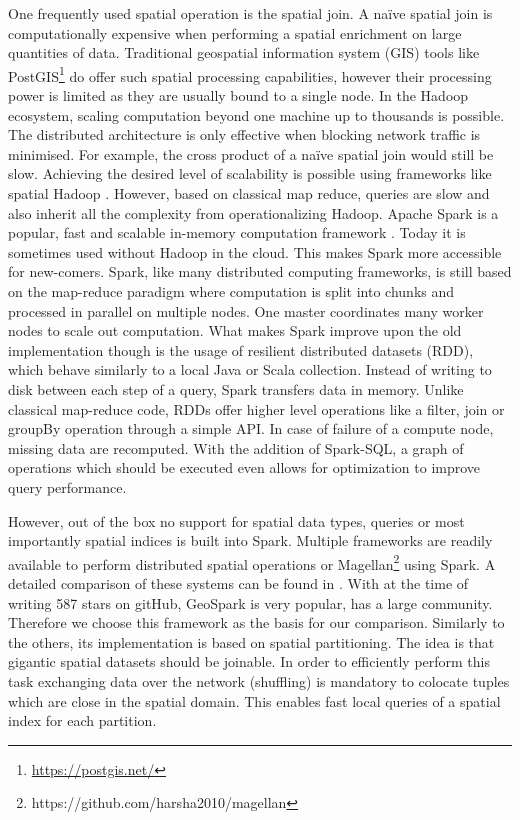 \documentclass[conference]{IEEEtran}
\begin{document}
One frequently used spatial operation is the spatial join. 
A naïve spatial join is computationally expensive when performing a spatial enrichment on large quantities of data. Traditional geospatial information system (GIS) tools like PostGIS\footnote{\url{https://postgis.net/}} do offer such spatial processing capabilities,
however their processing power is limited as they are usually bound to a single node.
In the Hadoop ecosystem, scaling computation beyond one machine up to thousands is possible.
The distributed architecture is only effective when blocking network traffic is minimised. For 
example, the cross product of a naïve spatial join would still be slow.
Achieving the desired level of scalability is possible using frameworks like spatial Hadoop \cite{Eldawy2015}.
However, based on classical map reduce, queries are slow and also inherit all the complexity from operationalizing Hadoop.
Apache Spark is a popular, fast and scalable in-memory computation framework \cite{Zaharia2012}.
Today it is sometimes used without Hadoop in the cloud. 
This makes Spark more accessible for new-comers.
Spark, like many distributed computing frameworks, is still based on the map-reduce paradigm where computation is split into chunks and processed in parallel on multiple nodes.
One master coordinates many worker nodes to scale out computation.
What makes Spark improve upon the old implementation though is the usage of resilient distributed datasets (RDD), which behave similarly to a local Java or Scala collection.
Instead of writing to disk between each step of a query, Spark transfers data in memory.
Unlike classical map-reduce code, RDDs offer higher level operations like a filter, join or groupBy operation through a simple API.
In case of failure of a compute node, missing data are recomputed.
With the addition of Spark-SQL, a graph of operations which should be executed even allows for  optimization to improve query performance.

However, out of the box no support for spatial data types, queries or most importantly spatial indices is built into Spark.
Multiple frameworks are readily available to perform distributed spatial operations \cite{Tangy2015, Yu2017, Xie2016, Yu2019} or Magellan\footnote{https://github.com/harsha2010/magellan} using Spark.
A detailed comparison of these systems can be found in \cite{Yu2019, Garcia-Garcia2017}.
With at the time of writing 587 stars on gitHub, GeoSpark \cite{Yu2015} is very popular, has a large community.
Therefore we choose this framework as the basis for our comparison.
Similarly to the others, its implementation is based on spatial partitioning.
The idea is that gigantic spatial datasets should be joinable.
In order to efficiently perform this task exchanging data over the network (shuffling) is mandatory to colocate tuples which are close in the spatial domain.
This enables fast local queries of a spatial index for each partition.
\end{document}
